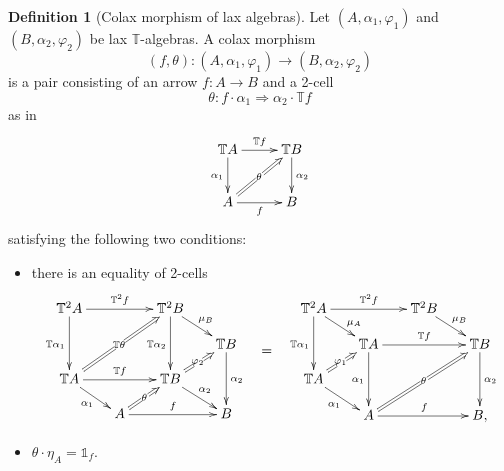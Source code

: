 \documentclass[12pt,leqno]{amsart}
\theoremstyle{definition}
\newtheorem{definition}[theorem]{Definition}
\def\T{\mathbb{T}}
\def\id{{\mathbb 1}}
\newcommand{\4}{\texttt{4}}
\renewcommand{\phi}{\varphi}
\begin{document}
\begin{definition}[Colax morphism of lax algebras]
\label{Zitra je Den otevreneho letiste.}
Let $(A,\alpha_1,\phi_1)$ and $(B,\alpha_2,\phi_2)$ be lax
$\T$-algebras. %
A colax morphism
\[
(f,\theta)\colon (A,\alpha_1,\phi_1)\to (B,\alpha_2,\phi_2)
\] 
is a pair consisting of an arrow $f\colon A\to B$ and a 2-cell
\[
\theta\colon f\cdot \alpha_1 \Rightarrow \alpha_2\cdot \T f
\]
as in
\[
\xymatrix@R=2.5em@C=2.5em{
\T A \ar[r]^{\T f} \ar[d]_{\alpha_1} 
& \T B\ar[d]^{\alpha_2} \ar@{<=}[dl]|{\theta\rule{.1em}{0pt}}
\\
A \ar[r]_{f} & B
}
\]
satisfying the following two conditions:
\begin{itemize}[topsep=0pt, partopsep=0pt, itemsep=0pt, itemindent=-1em]
\item[(i)]
there is an equality of 2-cells
\[
\xymatrix@R=1.2em@C=1.7em{
\T^2 A \ar[rr]^{\T^2 f}\ar[dd]_{\T \alpha_1} && \T^2 B \ar@{<=}[lldd]|{\T\theta\rule{.1em}{0pt}}\ar[rd]^{\mu_B} \ar[dd]_{\T \alpha_2}
\\
&&& \T B \ar[dd]^{\alpha_2} \ar@{<=}[ld]|{\phi_2\rule{.1em}{0pt}}
\\
\T A  \ar[rr]^{\T f} \ar[rd]_{\alpha_1} && \T B
\ar@{<=}[ld]|{\theta\rule{.1em}{0pt}}
\ar[dr]^{\alpha_2}
\\
&A \ar[rr]^f && B
}
\hskip 1em
\raisebox{-3em}{$=$} \hskip 1em
\xymatrix@R=1.2em@C=1.7em{
\T^2 A \ar[rr]^{\T^2 f}\ar[dd]_{{\T \alpha_1}} \ar[rd]^(.6){\mu_A}   && 
\T^2 B \ar[rd]^{\mu_B} 
\\
&\T A \ar@{<=}[ld]|{\phi_1\rule{.1em}{0pt}} \ar[rr]^{\T f}   \ar[dd]_{\alpha_1}&& \T B \ar[dd]^{\alpha_2} 
\ar@{<=}[lldd]|{\theta\rule{.1em}{0pt}}
\\
\T A \ar[rd]_{\alpha_1} &&
\\
&A \ar[rr]^f && B,
}
\]
\item[(ii)] 
$\theta\cdot\eta_A=\id_f$.
\end{itemize} 
\end{definition}
\end{document}
